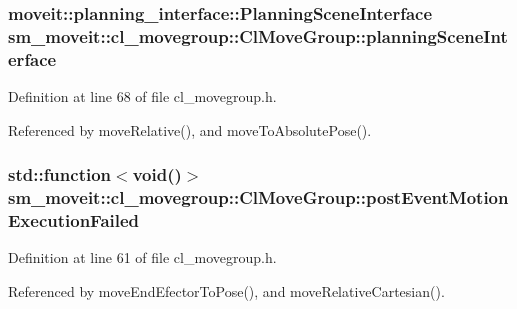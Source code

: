 \subsubsection[{\texorpdfstring{planning\+Scene\+Interface}{planningSceneInterface}}]{\setlength{\rightskip}{0pt plus 5cm}moveit\+::planning\+\_\+interface\+::\+Planning\+Scene\+Interface sm\+\_\+moveit\+::cl\+\_\+movegroup\+::\+Cl\+Move\+Group\+::planning\+Scene\+Interface}\hypertarget{classsm__moveit_1_1cl__movegroup_1_1ClMoveGroup_a26b5c9e0aef1cd67ee977a756b69cf76}{}\label{classsm__moveit_1_1cl__movegroup_1_1ClMoveGroup_a26b5c9e0aef1cd67ee977a756b69cf76}


Definition at line 68 of file cl\+\_\+movegroup.\+h.



Referenced by move\+Relative(), and move\+To\+Absolute\+Pose().

\subsubsection[{\texorpdfstring{post\+Event\+Motion\+Execution\+Failed}{postEventMotionExecutionFailed}}]{\setlength{\rightskip}{0pt plus 5cm}std\+::function$<$void()$>$ sm\+\_\+moveit\+::cl\+\_\+movegroup\+::\+Cl\+Move\+Group\+::post\+Event\+Motion\+Execution\+Failed\hspace{0.3cm}{\ttfamily [private]}}\hypertarget{classsm__moveit_1_1cl__movegroup_1_1ClMoveGroup_a742a3504755ab7bae290c87290d2bf3f}{}\label{classsm__moveit_1_1cl__movegroup_1_1ClMoveGroup_a742a3504755ab7bae290c87290d2bf3f}


Definition at line 61 of file cl\+\_\+movegroup.\+h.



Referenced by move\+End\+Efector\+To\+Pose(), and move\+Relative\+Cartesian().

